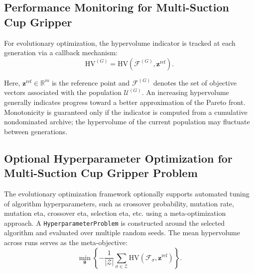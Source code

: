 \subsection{Performance Monitoring for Multi-Suction Cup Gripper}

For evolutionary optimization, the hypervolume indicator is tracked at each generation via a
callback mechanism:
\begin{equation}
    \mathrm{HV}^{(G)}
    =
    \mathrm{HV}\!\left(\mathcal{F}^{(G)},\mathbf{z}^{\mathrm{ref}}\right).
\end{equation}

Here, $\mathbf{z}^{\mathrm{ref}} \in \mathbb{R}^{m}$ is the reference point and $\mathcal{F}^{(G)}$
denotes the set of objective vectors associated with the population $\mathcal{U}^{(G)}$. An
increasing hypervolume generally indicates progress toward a better approximation of the Pareto
front. Monotonicity is guaranteed only if the indicator is computed from a cumulative nondominated
archive; the hypervolume of the current population may fluctuate between generations.

\subsection{Optional Hyperparameter Optimization for Multi-Suction Cup Gripper Problem}

The evolutionary optimization framework optionally supports automated tuning of algorithm hyperparameters, such as crossover probability, mutation
rate, mutation eta, crossover eta, selection eta, etc. using a meta-optimization approach. A \texttt{HyperparameterProblem} is constructed around the
selected algorithm and evaluated over multiple random seeds. The mean hypervolume across runs serves as the meta-objective:
\begin{equation}
    \min_{\boldsymbol{\theta}}
    \left\{
        -\frac{1}{|\mathcal{Z}|}
        \sum_{\sigma \in \mathcal{Z}}
        \mathrm{HV}\!\left(\mathcal{F}_{\sigma},\mathbf{z}^{\mathrm{ref}}\right)
    \right\}.
\end{equation}

